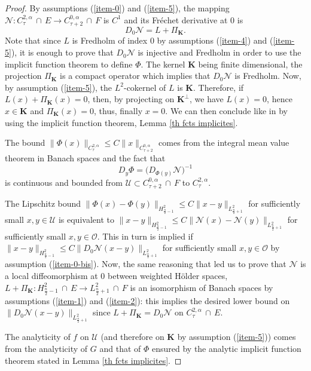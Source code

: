 \documentclass[a4paper,11pt,reqno]{amsart}
\numberwithin{equation}{section}
\begin{document}
	\begin{proof}		
		By assumptions (\ref{item-0}) and (\ref{item-5}), the mapping $\mathcal{N} : C^{2,\alpha}_{\tau}\,\cap\, E\to   C^{0,\alpha}_{\tau+2}\,\cap\,F$ is $C^1$ and its Fr\'echet derivative at $0$ is 
		$$D_0\mathcal{N} = L + \Pi_\mathbf{K}.$$
		Note that since $L$ is Fredholm of index $0$ by assumptions (\ref{item-4}) and (\ref{item-5}), it is enough to prove that $D_0\mathcal{N}$ is injective and Fredholm in order to use the implicit function theorem to define $\Phi$. The kernel $\mathbf{K}$ being finite dimensional, the projection $\Pi_{\mathbf{K}}$ is a compact operator which implies that $D_0\mathcal{N}$ is Fredholm. Now, by assumption (\ref{item-5}), the $L^2$-cokernel of $L$ is $\mathbf{K}$. Therefore, if $L(x) + \Pi_\mathbf{K}(x) = 0$, then, by projecting on $\mathbf{K}^\perp$, we have $L(x) = 0$, hence $x\in \mathbf{K}$ and $\Pi_\mathbf{K}(x) =0$, thus, finally $x = 0$. We can then conclude like in \cite[Lemma 7.5]{Col-Min-Ein-Tan-Con} by using the implicit function theorem, Lemma \ref{th fcts implicites}. 
		
		The bound $ \|\Phi(x)\|_{C^{2,\alpha}_{\tau}}\leq C \|x\|_{C^{0,\alpha}_{\tau+2}} $ comes from the integral mean value theorem in Banach spaces and the fact that 
		\begin{equation}
		D_y\Phi = \big(D_{\Phi(y)}\mathcal{N}\big)^{-1}\label{inverse linearisation Phi}
		\end{equation}
		is continuous and bounded from $\mathcal{U} \subset C^{0,\alpha}_{\tau+2}\,\cap\,F$ to $C^{2,\alpha}_{\tau}$.
		
		The Lipschitz bound $ \|\Phi(x)-\Phi(y)\|_{H^2_{\frac{n}{2}-1}}\leq C \|x-y\|_{L^2_{\frac{n}{2}+1}} $ for sufficiently small $x,y\in \mathcal{U}$ is equivalent to $ \|x-y\|_{H^2_{\frac{n}{2}-1}}\leq C \|\mathcal{N}(x)-\mathcal{N}(y)\|_{L^2_{\frac{n}{2}+1}} $ for sufficiently small $x,y\in \mathcal{O}$. This in turn is implied if $ \|x-y\|_{H^2_{\frac{n}{2}-1}}\leq C \|D_0\mathcal{N}(x-y)\|_{L^2_{\frac{n}{2}+1}} $ for sufficiently small $x,y\in \mathcal{O}$ by assumption (\ref{item-0-bis}). Now, the same reasoning that led us to prove that $\mathcal{N}$ is a local diffeomorphism at $0$ between weighted H\"older spaces, $L+\Pi_{\mathbf{K}}:H^{2}_{\frac{n}{2}-1}\,\cap\,E\rightarrow L^2_{\frac{n}{2}+1}\,\cap\,F$ is an isomorphism of Banach spaces by assumptions (\ref{item-1}) and (\ref{item-2}): this implies the desired lower bound on $\|D_0\mathcal{N}(x-y)\|_{L^2_{\frac{n}{2}+1}}$ since $L+\Pi_{\mathbf{K}}=D_0\mathcal{N}$ on $C^{2,\alpha}_{\tau}\,\cap\,E$.
		
		
		
		The analyticity of $f$ on $\mathcal{U}$ (and therefore on $\mathbf{K}$ by assumption (\ref{item-5})) comes from the analyticity of $G$ and that of $\Phi$ ensured by the analytic implicit function theorem stated in Lemma \ref{th fcts implicites}.
	\end{proof}
\end{document}
